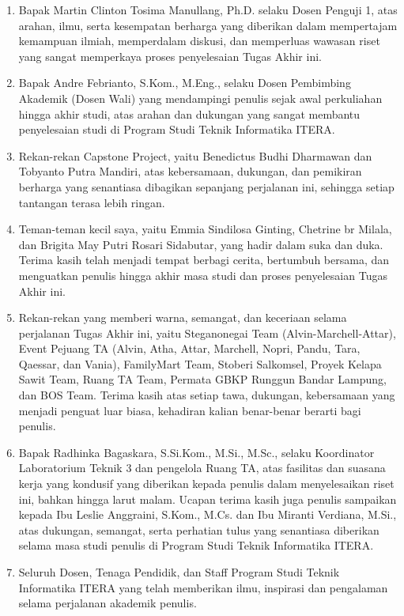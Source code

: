 \begin{justifying}
\begin{enumerate}[itemsep=1pt, topsep=0pt, parsep=0pt, partopsep=0pt]
		\item {Bapak Martin Clinton Tosima Manullang, Ph.D. selaku Dosen Penguji 1, atas arahan, ilmu, serta kesempatan berharga yang diberikan dalam mempertajam kemampuan ilmiah, memperdalam diskusi, dan memperluas wawasan riset yang sangat memperkaya proses penyelesaian Tugas Akhir ini.}
		\item {Bapak Andre Febrianto, S.Kom., M.Eng., selaku Dosen Pembimbing Akademik (Dosen Wali) yang mendampingi penulis sejak awal perkuliahan hingga akhir studi, atas arahan dan dukungan yang sangat membantu penyelesaian studi di Program Studi Teknik Informatika ITERA.}
		\item {Rekan-rekan Capstone Project, yaitu Benedictus Budhi Dharmawan dan Tobyanto Putra Mandiri, atas kebersamaan, dukungan, dan pemikiran berharga yang senantiasa dibagikan sepanjang perjalanan ini, sehingga setiap tantangan terasa lebih ringan.}
		\item {Teman-teman kecil saya, yaitu Emmia Sindilosa Ginting, Chetrine br Milala, dan Brigita May Putri Rosari Sidabutar, yang hadir dalam suka dan duka. Terima kasih telah menjadi tempat berbagi cerita, bertumbuh bersama, dan menguatkan penulis hingga akhir masa studi dan proses penyelesaian Tugas Akhir ini.}
		\item {Rekan-rekan yang memberi warna, semangat, dan keceriaan selama perjalanan Tugas Akhir ini, yaitu Steganonegai Team (Alvin-Marchell-Attar), Event Pejuang TA (Alvin, Atha, Attar, Marchell, Nopri, Pandu, Tara, Qaessar, dan Vania), FamilyMart Team, Stoberi Salkomsel, Proyek Kelapa Sawit Team, Ruang TA Team, Permata GBKP Runggun Bandar Lampung, dan BOS Team. Terima kasih atas setiap tawa, dukungan, kebersamaan yang menjadi penguat luar biasa, kehadiran kalian benar-benar berarti bagi penulis.}
		\item {Bapak Radhinka Bagaskara, S.Si.Kom., M.Si., M.Sc., selaku Koordinator Laboratorium Teknik 3 dan pengelola Ruang TA, atas fasilitas dan suasana kerja yang kondusif yang diberikan kepada penulis dalam menyelesaikan riset ini, bahkan hingga larut malam. Ucapan terima kasih juga penulis sampaikan kepada Ibu Leslie Anggraini, S.Kom., M.Cs. dan Ibu Miranti Verdiana, M.Si., atas dukungan, semangat, serta perhatian tulus yang senantiasa diberikan selama masa studi penulis di Program Studi Teknik Informatika ITERA.}
		\item {Seluruh Dosen, Tenaga Pendidik, dan Staff Program Studi Teknik Informatika ITERA yang telah memberikan ilmu, inspirasi dan pengalaman selama perjalanan akademik penulis.}

\end{enumerate}
\end{justifying}
